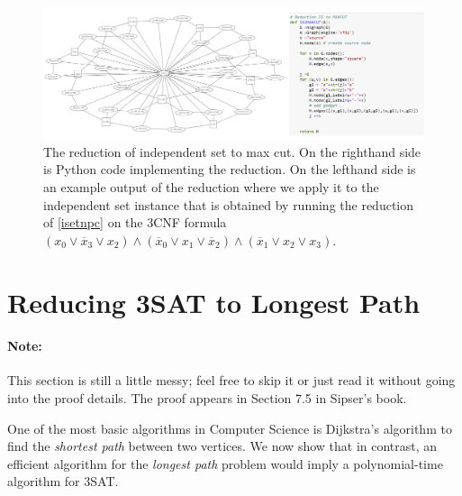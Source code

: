 \begin{figure}
\centering
\includegraphics[width=\textwidth, height=0.25\paperheight, keepaspectratio]{../figure/is2maxcut.png}
\caption{The reduction of independent set to max cut. On the righthand
side is Python code implementing the reduction. On the lefthand side is
an example output of the reduction where we apply it to the independent
set instance that is obtained by running the reduction of \cref{isetnpc}
on the 3CNF formula
\((x_0 \vee \overline{x}_3 \vee x_2) \wedge (\overline{x}_0 \vee x_1 \vee \overline{x}_2) \wedge (\overline{x}_1 \vee x_2 \vee x_3)\).}
\label{isettomaxcutcodefig}
\end{figure}

\section{Reducing 3SAT to Longest Path}\label{Reducing-SAT-to-Longest-P}

\paragraph{Note:} This section is still a little messy; feel free to
skip it or just read it without going into the proof details. The proof
appears in Section 7.5 in Sipser's book.

One of the most basic algorithms in Computer Science is Dijkstra's
algorithm to find the \emph{shortest path} between two vertices. We now
show that in contrast, an efficient algorithm for the \emph{longest
path} problem would imply a polynomial-time algorithm for 3SAT.

\hypertarget{longpaththm}{}


